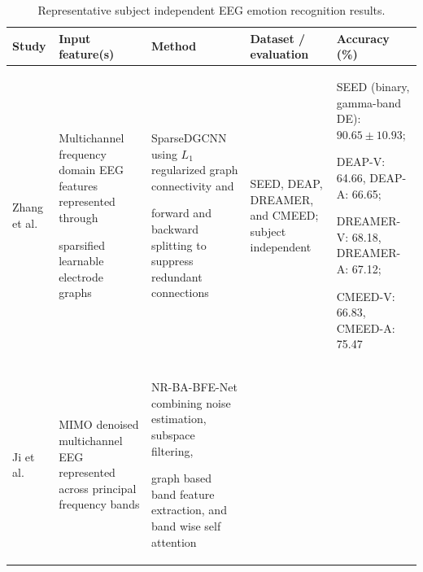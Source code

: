 \documentclass[ASNA,twocolumn]{USG}
\newcommand{\lightrowsep}{%
  \arrayrulecolor{lightrowgray}%
  \specialrule{0.30pt}{3.5pt}{3.5pt}%
  \arrayrulecolor{black}%
}
\begin{document}
\begin{table}

\addtocounter{table}{-1}

\centering

\caption{Representative subject independent EEG emotion recognition results.}

\scriptsize

\setlength{\tabcolsep}{2.5pt}

\renewcommand{\arraystretch}{1.12}

\begin{tabularx}{\textheight}{>{\raggedright\arraybackslash}p{3.15cm}>{\raggedright\arraybackslash}X>{\raggedright\arraybackslash}X>{\raggedright\arraybackslash}p{3.45cm}>{\raggedright\arraybackslash}p{5.0cm}}

\toprule

\textbf{Study} &

\textbf{Input feature(s)} &

\textbf{Method} &

\textbf{Dataset / evaluation} &

\textbf{Accuracy (\%)} \\

\midrule


Zhang et al. \cite{zhang2021sparsedgcnn} &

Multichannel frequency domain EEG features represented through

sparsified learnable electrode graphs &

SparseDGCNN using $L_1$ regularized graph connectivity and

forward and backward splitting to suppress redundant connections &

SEED, DEAP, DREAMER, and CMEED; subject independent &

SEED (binary, gamma-band DE): $90.65 \pm 10.93$;

DEAP-V: 64.66, DEAP-A: 66.65;

DREAMER-V: 68.18, DREAMER-A: 67.12;

CMEED-V: 66.83, CMEED-A: 75.47 \\

\lightrowsep

Ji et al. \cite{ji2026enhanced} &

MIMO denoised multichannel EEG represented across principal frequency bands &

NR-BA-BFE-Net combining noise estimation, subspace filtering,

graph based band feature extraction, and band wise self attention &


\end{tabularx}
\end{table}
\end{document}
